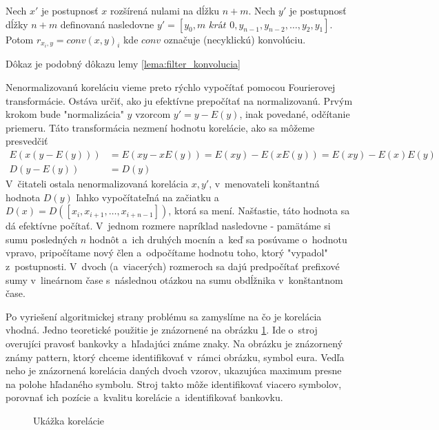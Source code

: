 \begin{lema}
    Nech $x'$ je postupnosť $x$ rozšírená nulami na dĺžku $n+m$.
    Nech $y'$ je postupnosť dĺžky $n+m$ definovaná nasledovne
        $y'=[y_0, \textit{$m$ krát }0, y_{n-1}, y_{n-2}, \dots, y_2,
        y_1]$.
    Potom $r_{x_i,y} = conv(x,y)_i$ kde $conv$ označuje (necyklickú)
    konvolúciu.
\end{lema}
\begin{dokaz}
    Dôkaz je podobný dôkazu lemy \ref{lema:filter_konvolucia}
\end{dokaz}
Nenormalizovanú koreláciu vieme preto rýchlo vypočítať pomocou
Fourierovej transformácie. Ostáva určiť, ako ju efektívne prepočítať
na normalizovanú.
Prvým krokom bude "normalizácia" $y$ vzorcom $y' = y-E(y)$, inak povedané,
odčítanie priemeru. Táto transformácia nezmení hodnotu korelácie, ako
sa môžeme presvedčiť
\begin{align*}
    E(x (y-E(y))) &= E(x y - x E(y)) = E(xy) - E(x E(y)) = E(xy) -
    E(x)E(y) \\
    D(y - E(y)) &= D(y)
\end{align*}
V~čitateli ostala nenormalizovaná korelácia $x,y'$, v~menovateli
konštantná hodnota $D(y)$ ľahko vypočítateľná na začiatku a $D(x)=
D([x_i,x_{i+1},\dots,x_{i+n-1}])$,
ktorá sa mení. Našťastie, táto hodnota sa dá efektívne počítať. 
V~jednom rozmere napríklad nasledovne - pamätáme si sumu posledných $n$
hodnôt a~ich druhých mocnín a~keď sa posúvame o~hodnotu vpravo,
pripočítame
nový člen a~odpočítame hodnotu toho, ktorý "vypadol" z~postupnosti. 
V~dvoch (a~viacerých) rozmeroch sa dajú predpočítať prefixové sumy 
v~lineárnom čase s~následnou otázkou na sumu obdĺžnika v~konštantnom
čase.

Po vyriešení algoritmickej strany problému sa zamyslíme na čo je
korelácia vhodná. Jedno teoretické použitie je znázornené na obrázku
\ref{fig:korelacia}. Ide o~stroj overujíci pravosť bankovky 
a~hľadajúci známe znaky. Na obrázku je znázornený známy pattern, ktorý
chceme identifikovať v~rámci obrázku, symbol eura. Vedľa neho je
znázornená korelácia daných dvoch vzorov, ukazujúca maximum presne na
polohe hľadaného symbolu. Stroj takto môže identifikovať viacero
symbolov, porovnať ich pozície a~kvalitu korelácie a~identifikovať
bankovku.
\begin{figure}[htp]
    \centering
    \caption{Ukážka korelácie}
    \label{fig:korelacia}
\end{figure}

